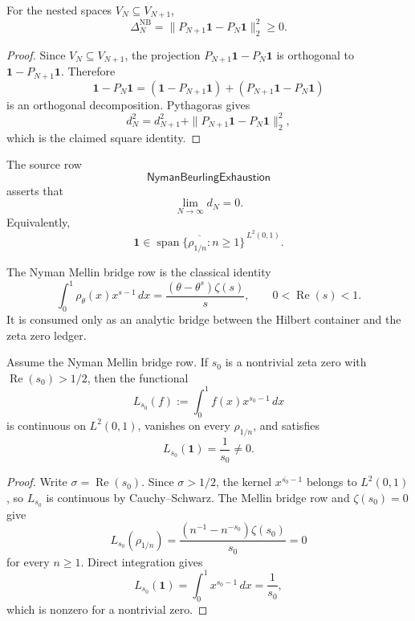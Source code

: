 \begin{theorem}
\label{thm:rh-nyman-drops-hilbert-squares}
For the nested spaces $V_N\subseteq V_{N+1}$,
$$
\Delta_N^{\mathrm{NB}}
=
\|P_{N+1}\mathbf 1-P_N\mathbf 1\|_2^2
\ge0.
$$
\end{theorem}

\begin{proof}
Since $V_N\subseteq V_{N+1}$, the projection
$P_{N+1}\mathbf 1-P_N\mathbf 1$ is orthogonal to
$\mathbf 1-P_{N+1}\mathbf 1$.  Therefore
$$
\mathbf 1-P_N\mathbf 1
=
(\mathbf 1-P_{N+1}\mathbf 1)
+
(P_{N+1}\mathbf 1-P_N\mathbf 1)
$$
is an orthogonal decomposition.  Pythagoras gives
$$
d_N^2
=
d_{N+1}^2
+
\|P_{N+1}\mathbf 1-P_N\mathbf 1\|_2^2,
$$
which is the claimed square identity.
\end{proof}

\begin{definition}
\label{def:rh-nyman-exhaustion-row}
The source row
$$
\mathsf{NymanBeurlingExhaustion}
$$
asserts that
$$
\lim_{N\to\infty} d_N=0.
$$
Equivalently,
$$
\mathbf 1\in
\overline{
\operatorname{span}\{\rho_{1/n}:n\ge1\}
}^{\,L^2(0,1)}.
$$
\end{definition}

\begin{definition}
\label{def:rh-nyman-mellin-bridge-row}
The Nyman Mellin bridge row is the classical identity
$$
\int_0^1 \rho_\theta(x)x^{s-1}\,dx
=
\frac{(\theta-\theta^s)\zeta(s)}{s},
\qquad
0<\operatorname{Re}(s)<1.
$$
It is consumed only as an analytic bridge between the Hilbert container
and the zeta zero ledger.
\end{definition}

\begin{lemma}
\label{lem:rh-off-half-zero-nyman-separator}
Assume the Nyman Mellin bridge row.  If $s_0$ is a nontrivial zeta zero
with $\operatorname{Re}(s_0)>1/2$, then the functional
$$
L_{s_0}(f):=
\int_0^1 f(x)x^{s_0-1}\,dx
$$
is continuous on $L^2(0,1)$, vanishes on every $\rho_{1/n}$, and
satisfies
$$
L_{s_0}(\mathbf 1)=\frac{1}{s_0}\ne0.
$$
\end{lemma}

\begin{proof}
Write $\sigma=\operatorname{Re}(s_0)$.  Since $\sigma>1/2$, the kernel
$x^{\overline{s_0}-1}$ belongs to $L^2(0,1)$, so $L_{s_0}$ is
continuous by Cauchy--Schwarz.  The Mellin bridge row and
$\zeta(s_0)=0$ give
$$
L_{s_0}(\rho_{1/n})
=
\frac{(n^{-1}-n^{-s_0})\zeta(s_0)}{s_0}
=0
$$
for every $n\ge1$.  Direct integration gives
$$
L_{s_0}(\mathbf 1)
=
\int_0^1 x^{s_0-1}\,dx
=
\frac{1}{s_0},
$$
which is nonzero for a nontrivial zero.
\end{proof}

